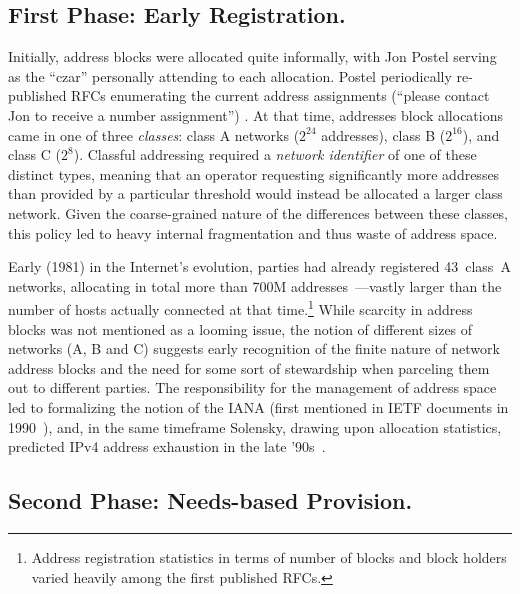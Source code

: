 \documentclass[letter]{sigcomm-alternate}
\begin{document}
\subsection{First Phase: Early Registration.}

Initially, address blocks were allocated quite informally, with Jon
Postel serving as the ``czar'' personally attending to each allocation.
Postel periodically re-published RFCs enumerating the current address
assignments (``please contact Jon to receive a number assignment'')
\cite{rfc790}. At that time, addresses block allocations came in one of
three \emph{classes}: class A networks ($2^{24}$ addresses), class B
($2^{16}$), and class C ($2^8$).  Classful addressing required a
\textit{network identifier} of one of these distinct types, meaning that an
operator requesting significantly more addresses than provided by a particular
threshold would instead be allocated a larger class network.  Given the
coarse-grained nature of the differences between these classes, this policy
led to heavy internal fragmentation and thus waste of address space.

Early (1981) in the Internet's evolution, parties had already registered
43~class~A networks, allocating in total more than 700M
addresses~\cite{rfc790}---vastly larger than the number of hosts actually
connected at that time.\footnote{
	Address registration statistics in terms of number of blocks and block 
	holders varied heavily among the first published RFCs.
}
While scarcity in address blocks was not mentioned as a looming issue, the
notion of different sizes of networks (A, B and C) suggests early
recognition of the finite nature of network address blocks and the need for
some sort of stewardship when parceling them out to different parties. The 
responsibility for the management of address space led to formalizing the 
notion of the IANA (first mentioned in IETF documents in 1990~\cite{rfc1060}),
and, in the same timeframe Solensky, drawing upon allocation statistics,
predicted IPv4 address exhaustion in the late '90s~\cite{solensky}.


\subsection{Second Phase: Needs-based Provision.}
\end{document}
